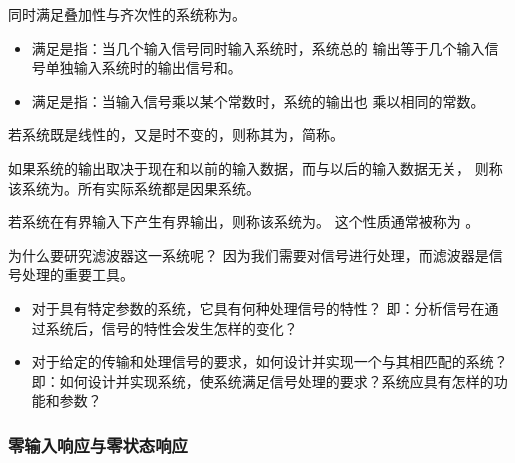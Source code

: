 \begin{definition}[线性系统]
    同时满足叠加性与齐次性的系统称为。
    \begin{itemize}
        \item 满足是指：当几个输入信号同时输入系统时，系统总的
            输出等于几个输入信号单独输入系统时的输出信号和。
        \item 满足是指：当输入信号乘以某个常数时，系统的输出也
            乘以相同的常数。
    \end{itemize}
\end{definition}

\begin{definition}[时不变系统]
    若系统既是线性的，又是时不变的，则称其为，简称。
\end{definition}

\begin{definition}[因果系统]
    如果系统的输出取决于现在和以前的输入数据，而与以后的输入数据无关，
    则称该系统为。所有实际系统都是因果系统。
\end{definition}

\begin{definition}[稳定系统]
    若系统在有界输入下产生有界输出，则称该系统为。
    这个性质通常被称为 。
\end{definition}

\begin{remark}
    为什么要研究滤波器这一系统呢？
    因为我们需要对信号进行处理，而滤波器是信号处理的重要工具。
    \begin{itemize}
        \item 对于具有特定参数的系统，它具有何种处理信号的特性？
            \subitem 即：分析信号在通过系统后，信号的特性会发生怎样的变化？
        \item 对于给定的传输和处理信号的要求，如何设计并实现一个与其相匹配的系统？
            \subitem 即：如何设计并实现系统，使系统满足信号处理的要求？系统应具有怎样的功能和参数？
    \end{itemize}
\end{remark}

\begin{example}[系统的描述方法]    
    
\end{example}

\subsubsection{零输入响应与零状态响应}

